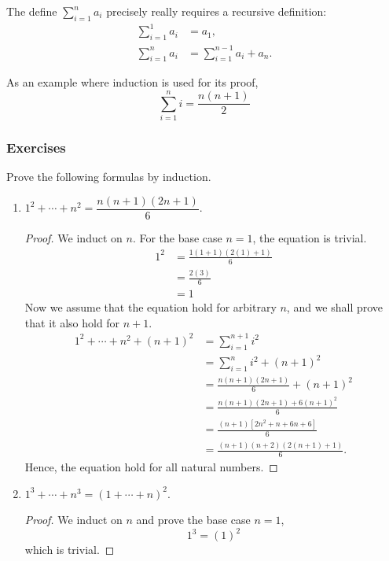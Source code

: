 The define $\sum \limits_{i=1}^{n} a_i$ precisely really requires a recursive
definition:
\begin{align}
    \sum \limits_{i=1}^{1} a_i &= a_1, \\
    \sum \limits_{i=1}^{n} a_i &= \sum \limits_{i=1}^{n-1} a_i + a_n.   
\end{align}

As an example where induction is used for its proof, 
\begin{equation*}
    \sum \limits_{i=1}^{n} i = \frac{n(n+1)}{2}
\end{equation*}

\pagebreak
\subsubsection{Exercises}
\begin{exercise}[\textbf{1}] Prove the following formulas by induction.
     \begin{enumerate}
         \item $1^2 + \dotsb + n^2 = \dfrac{n(n+1)(2n+1)}{6}$.
         \begin{proof} We induct on $n$. For the base case $n=1$, the equation
         is trivial.
        \begin{align*}
            1^2 &= \frac{1(1+1)(2(1)+1)}{6} \\
            &= \frac{2(3)}{6} \\
            &= 1
        \end{align*}
        Now we assume that the equation hold for arbitrary $n$, and we shall
        prove that it also hold for $n+1$.
        \begin{align*}
            1^2+\dotsb +n^2+(n+1)^2 &= \sum \limits_{i=1} ^{n+1} i^2 \\
            &=  \sum \limits_{i=1} ^{n} i^2 + (n+1)^2 \\
            &= \frac{n(n+1)(2n+1)}{6} + (n+1)^2 \\
            &= \frac{n(n+1)(2n+1)+6(n+1)^2}{6} \\
            &= \frac{(n+1)[2n^2+n+6n+6]}{6} \\
            &= \frac{(n+1)(n+2)(2(n+1)+1)}{6}.
        \end{align*}
        Hence, the equation hold for all natural numbers.
         \end{proof}
         \item $1^3+\dotsb +n^3 =(1+\dotsb +n)^2$.
         \begin{proof} We induct on $n$ and prove the base case $n=1$,
              \begin{equation*}
                  1^3 = (1)^2
              \end{equation*}
              which is trivial. 
              

\end{proof}
\end{enumerate}
\end{exercise}
